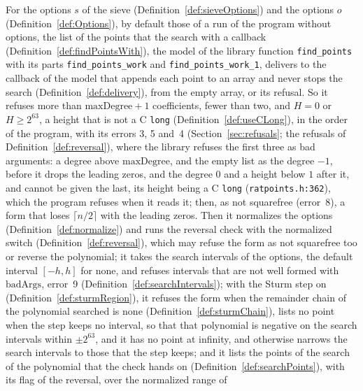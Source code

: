\begin{definition}\label{def:findPoints}
  \leanok
  For the options $s$ of the sieve (Definition~\ref{def:sieveOptions}) and the options $o$
  (Definition~\ref{def:Options}), by default those of a run of the program without options, the list
  of the points that the search with a callback (Definition~\ref{def:findPointsWith}), the model of
  the library function \verb|find_points| with its parts \verb|find_points_work| and
  \verb|find_points_work_1|, delivers to the callback of the model that appends each point to an
  array and never stops the search (Definition~\ref{def:delivery}), from the empty array, or its
  refusal. So it refuses more than $\mathrm{maxDegree} + 1$ coefficients, fewer than two, and $H =
  0$ or $H \ge 2^{63}$, a height that is not a C \verb|long| (Definition~\ref{def:useCLong}), in the
  order of the program, with its errors 3, 5 and~4 (Section~\ref{sec:refusals}; the refusals of
  Definition~\ref{def:reversal}), where the library refuses the first three as bad arguments: a
  degree above $\mathrm{maxDegree}$, and the empty list as the degree $-1$, before it drops the
  leading zeros, and the degree $0$ and a height below $1$ after it, and cannot be given the last,
  its height being a C \verb|long| (\verb|ratpoints.h:362|), which the program refuses when it reads
  it; then, as not squarefree (error~8), a form that loses $\lceil n/2 \rceil$ with the leading
  zeros. Then it normalizes the options (Definition~\ref{def:normalize}) and runs the reversal check
  with the normalized switch (Definition~\ref{def:reversal}), which may refuse the form as not
  squarefree too or reverse the polynomial; it takes the search intervals of the options, the
  default interval $[-h, h]$ for none, and refuses intervals that are not well formed with
  $\mathrm{badArgs}$, error~9 (Definition~\ref{def:searchIntervals}); with the Sturm step on
  (Definition~\ref{def:sturmRegion}), it refuses the form when the remainder chain of the polynomial
  searched is $\mathrm{none}$ (Definition~\ref{def:sturmChain}), lists no point when the step keeps
  no interval, so that that polynomial is negative on the search intervals within $\pm 2^{63}$, and
  it has no point at infinity, and otherwise narrows the search intervals to those that the step
  keeps; and it lists the points of the search of the polynomial that the check hands on
  (Definition~\ref{def:searchPoints}), with its flag of the reversal, over the normalized range of

\end{definition}
